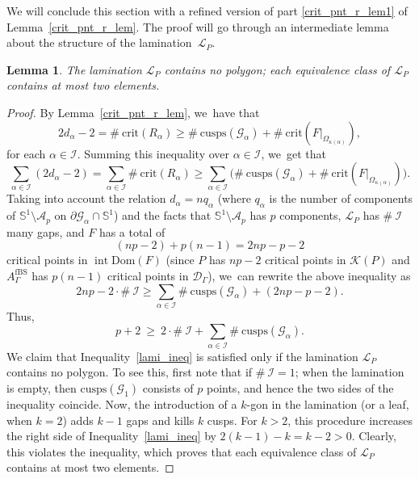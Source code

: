 \documentclass[JEP,XML,SOM,Unicode,NoFloatCountersInSection,published]{cedram}
\newtheorem{lemma}{Lemma}[section]
\theoremstyle{definition}
\theoremstyle{remark}
\DeclareMathOperator{\Int}{int}
\begin{document}
We will conclude this section with a refined version of part \eqref{crit_pnt_r_lem1} of Lemma~\ref{crit_pnt_r_lem}. The proof will go through an intermediate lemma about the structure of the lamination~$\mathcal{L}_P$.

\begin{lemma}\label{lami_no_poly_lem}
The lamination $\mathcal{L}_P$ contains no polygon; \ie each equivalence class of $\mathcal{L}_P$ contains at most two elements.
\end{lemma}
\begin{proof}
By Lemma~\ref{crit_pnt_r_lem}, we~have that
\[
2d_\alpha-2=\#\ \mathrm{crit}(R_\alpha)\geq \#\ \mathrm{cusps}(\mathcal{G}_\alpha) + \#\ \mathrm{crit}(F\vert_{\Omega_{\kappa(\alpha)}}),
\]
for each $\alpha\in\mathcal{I}$. Summing this inequality over $\alpha\in\mathcal{I}$, we~get that
\[
\sum_{\alpha\in\mathcal{I}} (2d_\alpha-2)=\sum_{\alpha\in\mathcal{I}} \#\ \mathrm{crit}(R_\alpha)\geq \sum_{\alpha\in\mathcal{I}} \bigl( \#\ \mathrm{cusps}(\mathcal{G}_\alpha) + \#\ \mathrm{crit}(F\vert_{\Omega_{\kappa(\alpha)}}) \bigr).
\]
Taking into account the relation $d_\alpha=n q_\alpha$ (where $q_\alpha$ is the number of components of $\mathbb{S}^1\setminus\mathcal{A}_p$ on $\partial\mathcal{G}_\alpha\cap\mathbb{S}^1$) and the facts that $\mathbb{S}^1\setminus \mathcal{A}_p$ has $p$ components, $\mathcal{L}_P$ has $\#\ \mathcal{I}$ many gaps, and $F$ has a total of
\[
(np-2)+p(n-1)=2np-p-2
\]
critical points in $\Int{\mathrm{Dom}(F)}$ (since $P$ has $np-2$ critical points in $\mathcal{K}(P)$ and $A_{\Gamma}^{\mathrm{fBS}}$ has $p(n-1)$ critical points in $\mathcal{D}_{\Gamma}$), we~can rewrite the above inequality as
\[
2np - 2\cdot \#\ \mathcal{I} \geq \sum_{\alpha\in\mathcal{I}} \#\ \mathrm{cusps}(\mathcal{G}_\alpha) + (2np-p-2).
\]
Thus,
\begin{equation}
p+2 \ \geq \ 2\cdot \#\ \mathcal{I} + \sum_{\alpha\in\mathcal{I}} \#\ \mathrm{cusps}(\mathcal{G}_\alpha).
\label{lami_ineq}
\end{equation}
We claim that Inequality~\eqref{lami_ineq} is satisfied only if the lamination $\mathcal{L}_P$ contains no polygon. To see this, first note that if $\#\ \mathcal{I}=1$; \ie when the lamination is empty, then $\mathrm{cusps}(\mathcal{G}_1)$ consists of $p$ points, and hence the two sides of the inequality coincide. Now, the introduction of a $k$-gon in the lamination (or a leaf, when $k=2$) adds $k-1$ gaps and kills $k$ cusps. For $k>2$, this procedure increases the right side of Inequality~\eqref{lami_ineq} by $2(k-1)-k=k-2>0$. Clearly, this violates the inequality, which proves that each equivalence class of $\mathcal{L}_P$ contains at most two elements.
\end{proof}
\end{document}
